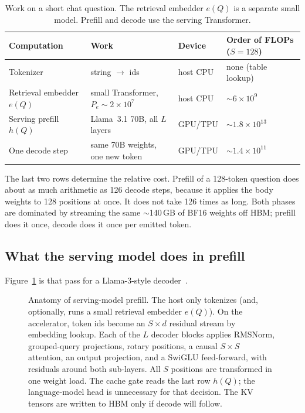 \begin{table}[t]
\centering
\caption{Work on a short chat question. The retrieval embedder $e(Q)$ is a separate small model. Prefill and decode use the serving Transformer.}
\label{tab:who}
\small
\begin{tabular}{@{}llll@{}}
\toprule
Computation & Work & Device & Order of FLOPs ($S{=}128$) \\
\midrule
Tokenizer & string $\to$ ids & host CPU & none (table lookup) \\
Retrieval embedder $e(Q)$ & small Transformer, $P_e\sim 2{\times}10^7$ & host CPU & $\sim 6\times 10^9$ \\
Serving prefill $h(Q)$ & Llama~3.1 70B, all $L$ layers & GPU/TPU & $\sim 1.8\times 10^{13}$ \\
One decode step & same 70B weights, one new token & GPU/TPU & $\sim 1.4\times 10^{11}$ \\
\bottomrule
\end{tabular}
\end{table}

The last two rows determine the relative cost. Prefill of a 128-token question does about as much arithmetic as 126 decode steps, because it applies the body weights to 128 positions at once. It does not take 126 times as long. Both phases are dominated by streaming the same $\sim$140\,GB of BF16 weights off HBM; prefill does it once, decode does it once per emitted token.

\subsection{What the serving model does in prefill}
\label{sec:cost-arch}

Figure~\ref{fig:prefill} is that pass for a Llama-3-style decoder~\citep{grattafiori2024llama,ainslie2023gqa}.

\begin{figure}[t]
\centering
\resizebox{\textwidth}{!}{}
\caption{Anatomy of serving-model prefill. The host only tokenizes (and, optionally, runs a small retrieval embedder $e(Q)$). On the accelerator, token ids become an $S\times d$ residual stream by embedding lookup. Each of the $L$ decoder blocks applies RMSNorm, grouped-query projections, rotary positions, a causal $S\times S$ attention, an output projection, and a SwiGLU feed-forward, with residuals around both sub-layers. All $S$ positions are transformed in one weight load. The cache gate reads the last row $h(Q)$; the language-model head is unnecessary for that decision. The KV tensors are written to HBM only if decode will follow.}
\label{fig:prefill}
\end{figure}

